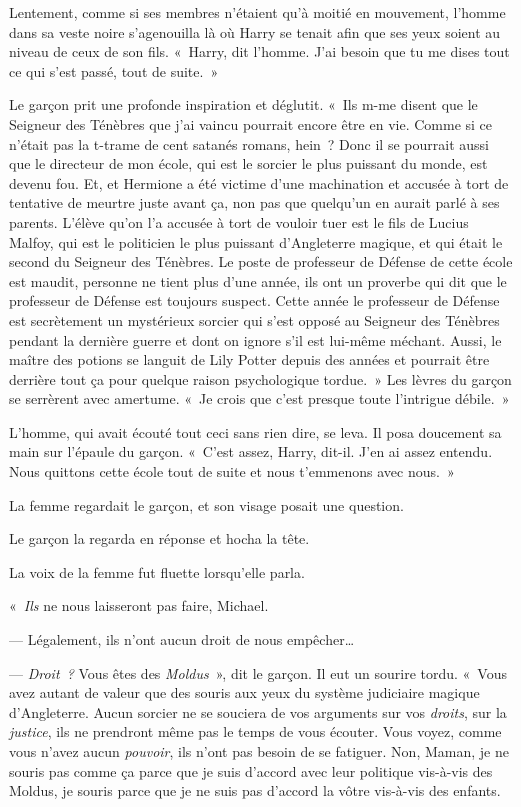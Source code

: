 Lentement, comme si ses membres n'étaient qu'à moitié en mouvement, l'homme dans sa veste noire s'agenouilla là où Harry se tenait afin que ses yeux soient au niveau de ceux de son fils.
«~Harry, dit l'homme.
J'ai besoin que tu me dises tout ce qui s'est passé, tout de suite.~»

Le garçon prit une profonde inspiration et déglutit.
«~Ils m-me disent que le Seigneur des Ténèbres que j'ai vaincu pourrait encore être en vie.
Comme si ce n'était pas la t-trame de cent satanés romans, hein~?
Donc il se pourrait aussi que le directeur de mon école, qui est le sorcier le plus puissant du monde, est devenu fou.
Et, et Hermione a été victime d'une machination et accusée à tort de tentative de meurtre juste avant ça, non pas que quelqu'un en aurait parlé à ses parents.
L'élève qu'on l'a accusée à tort de vouloir tuer est le fils de Lucius Malfoy, qui est le politicien le plus puissant d'Angleterre magique, et qui était le second du Seigneur des Ténèbres.
Le poste de professeur de Défense de cette école est maudit, personne ne tient plus d'une année, ils ont un proverbe qui dit que le professeur de Défense est toujours suspect.
Cette année le professeur de Défense est secrètement un mystérieux sorcier qui s'est opposé au Seigneur des Ténèbres pendant la dernière guerre et dont on ignore s'il est lui-même méchant.
Aussi, le maître des potions se languit de Lily Potter depuis des années et pourrait être derrière tout ça pour quelque raison psychologique tordue.~»
Les lèvres du garçon se serrèrent avec amertume.
«~Je crois que c'est presque toute l'intrigue débile.~»

L'homme, qui avait écouté tout ceci sans rien dire, se leva.
Il posa doucement sa main sur l'épaule du garçon.
«~C'est assez, Harry, dit-il.
J'en ai assez entendu.
Nous quittons cette école tout de suite et nous t'emmenons avec nous.~»

La femme regardait le garçon, et son visage posait une question.

Le garçon la regarda en réponse et hocha la tête.

La voix de la femme fut fluette lorsqu'elle parla.

«~\emph{Ils} ne nous laisseront pas faire, Michael.

--- Légalement, ils n'ont aucun droit de nous empêcher…

--- \emph{Droit~?} Vous êtes des \emph{Moldus}~», dit le garçon.
Il eut un sourire tordu.
«~Vous avez autant de valeur que des souris aux yeux du système judiciaire magique d'Angleterre.
Aucun sorcier ne se souciera de vos arguments sur vos \emph{droits}, sur la \emph{justice}, ils ne prendront même pas le temps de vous écouter.
Vous voyez, comme vous n'avez aucun \emph{pouvoir}, ils n'ont pas besoin de se fatiguer.
Non, Maman, je ne souris pas comme ça parce que je suis d'accord avec leur politique vis-à-vis des Moldus, je souris parce que je ne suis pas d'accord la vôtre vis-à-vis des enfants.


